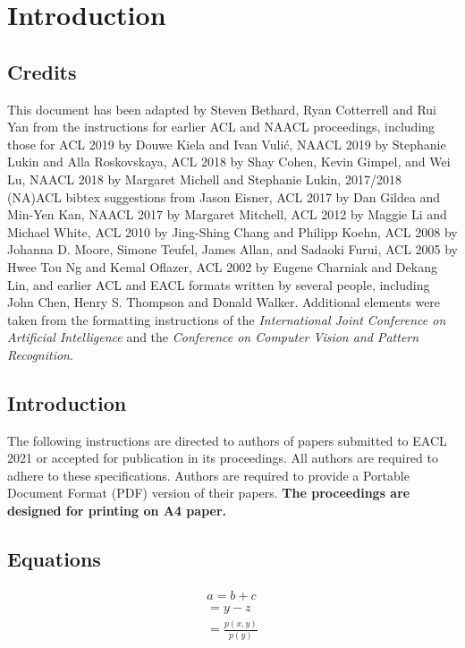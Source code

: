 \section{Introduction}
\label{sec:intro}



\subsection{Credits}

This document has been adapted
by Steven Bethard, Ryan Cotterrell and Rui Yan
from the instructions for earlier ACL and NAACL proceedings, including those for 
ACL 2019 by Douwe Kiela and Ivan Vuli\'{c},
NAACL 2019 by Stephanie Lukin and Alla Roskovskaya, 
ACL 2018 by Shay Cohen, Kevin Gimpel, and Wei Lu, 
NAACL 2018 by Margaret Michell and Stephanie Lukin,
2017/2018 (NA)ACL bibtex suggestions from Jason Eisner,
ACL 2017 by Dan Gildea and Min-Yen Kan, 
NAACL 2017 by Margaret Mitchell, 
ACL 2012 by Maggie Li and Michael White, 
ACL 2010 by Jing-Shing Chang and Philipp Koehn, 
ACL 2008 by Johanna D. Moore, Simone Teufel, James Allan, and Sadaoki Furui, 
ACL 2005 by Hwee Tou Ng and Kemal Oflazer, 
ACL 2002 by Eugene Charniak and Dekang Lin, 
and earlier ACL and EACL formats written by several people, including
John Chen, Henry S. Thompson and Donald Walker.
Additional elements were taken from the formatting instructions of the \emph{International Joint Conference on Artificial Intelligence} and the \emph{Conference on Computer Vision and Pattern Recognition}.

\subsection{Introduction}

The following instructions are directed to authors of papers submitted to EACL 2021 or accepted for publication in its proceedings.
All authors are required to adhere to these specifications.
Authors are required to provide a Portable Document Format (PDF) version of their papers.
\textbf{The proceedings are designed for printing on A4 paper.}

\subsection{Equations}

\begin{eqnarray}
	a  =  b + c \\
	=  y - z \\
	= \frac{p(x,y)}{p(y)}
\end{eqnarray}


